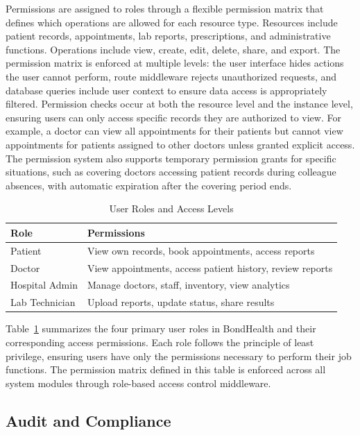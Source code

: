 \justifying
\noindent Permissions are assigned to roles through a flexible permission matrix that defines which operations are allowed for each resource type. Resources include patient records, appointments, lab reports, prescriptions, and administrative functions. Operations include view, create, edit, delete, share, and export. The permission matrix is enforced at multiple levels: the user interface hides actions the user cannot perform, route middleware rejects unauthorized requests, and database queries include user context to ensure data access is appropriately filtered. Permission checks occur at both the resource level and the instance level, ensuring users can only access specific records they are authorized to view. For example, a doctor can view all appointments for their patients but cannot view appointments for patients assigned to other doctors unless granted explicit access. The permission system also supports temporary permission grants for specific situations, such as covering doctors accessing patient records during colleague absences, with automatic expiration after the covering period ends.

\begin{table}[h]
\centering
\caption{User Roles and Access Levels}
\label{tab:roles}
\begin{tabular}{|l|l|}
\hline
\textbf{Role} & \textbf{Permissions} \\
\hline
Patient & View own records, book appointments, access reports \\
\hline
Doctor & View appointments, access patient history, review reports \\
\hline
Hospital Admin & Manage doctors, staff, inventory, view analytics \\
\hline
Lab Technician & Upload reports, update status, share results \\
\hline
\end{tabular}
\end{table}
\noindent Table~\ref{tab:roles} summarizes the four primary user roles in BondHealth and their corresponding access permissions. Each role follows the principle of least privilege, ensuring users have only the permissions necessary to perform their job functions. The permission matrix defined in this table is enforced across all system modules through role-based access control middleware.

\subsection{Audit and Compliance}

